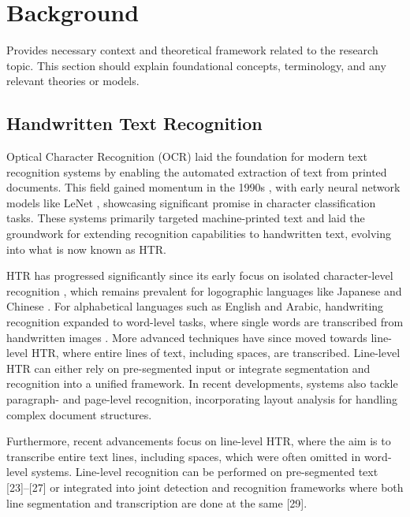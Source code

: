 \documentclass[conference]{IEEEtran}
\begin{document}
\section{Background}

Provides necessary context and theoretical framework related to the research topic. This section should explain foundational concepts, terminology, and any relevant theories or models.

\subsection{Handwritten Text Recognition}

Optical Character Recognition (OCR) laid the foundation for modern text recognition systems by enabling the automated extraction of text from printed documents. This field gained momentum in the 1990s \cite{parvez2013offline}, with early neural network models like LeNet \cite{lecun1998gradient}, showcasing significant promise in character classification tasks. These systems primarily targeted machine-printed text and laid the groundwork for extending recognition capabilities to handwritten text, evolving into what is now known as HTR.

HTR has progressed significantly since its early focus on isolated character-level recognition \cite{cilia2019ranking}, which remains prevalent for logographic languages like Japanese \cite{clanuwat2019kuronet}  and Chinese \cite{jaderberg2015spatial}. For alphabetical languages such as English and Arabic, handwriting recognition expanded to word-level tasks, where single words are transcribed from handwritten images \cite{bhunia2019handwriting, such2018fully}. More advanced techniques have since moved towards line-level HTR, where entire lines of text, including spaces, are transcribed. Line-level HTR can either rely on pre-segmented input or integrate segmentation and recognition into a unified framework. In recent developments, systems also tackle paragraph- and page-level recognition, incorporating layout analysis for handling complex document structures.

Furthermore, recent advancements focus on line-level HTR, where the aim is to transcribe entire text lines, including spaces, which were often omitted in word-level systems. Line-level recognition can be performed on pre-segmented text [23]–[27] or integrated into joint detection and recognition frameworks where both line segmentation and transcription are done at the same  [29]. 
\end{document}
